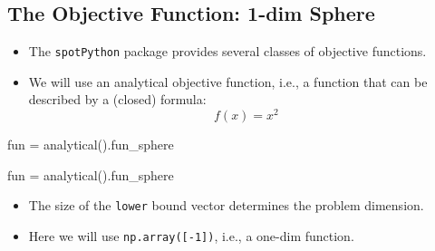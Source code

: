 \documentclass[
  letterpaper,
  DIV=11,
  numbers=noendperiod]{scrreprt}
\newenvironment{Shaded}{\begin{snugshade}}{\end{snugshade}}
\newcommand{\NormalTok}[1]{\textcolor[rgb]{0.00,0.23,0.31}{#1}}
\newcommand{\OperatorTok}[1]{\textcolor[rgb]{0.37,0.37,0.37}{#1}}
\providecommand{\tightlist}{%
  \setlength{\itemsep}{0pt}\setlength{\parskip}{0pt}}\usepackage{longtable,booktabs,array}
\begin{document}
\hypertarget{the-objective-function-1-dim-sphere}{%
\subsection{The Objective Function: 1-dim
Sphere}\label{the-objective-function-1-dim-sphere}}

\begin{itemize}
\tightlist
\item
  The \texttt{spotPython} package provides several classes of objective
  functions.
\item
  We will use an analytical objective function, i.e., a function that
  can be described by a (closed) formula: \[f(x) = x^2 \]
\end{itemize}

\begin{Shaded}
\begin{Highlighting}[]
\NormalTok{fun }\OperatorTok{=}\NormalTok{ analytical().fun\_sphere}
\end{Highlighting}
\end{Shaded}

\begin{Shaded}
\begin{Highlighting}[]
\NormalTok{fun }\OperatorTok{=}\NormalTok{ analytical().fun\_sphere}
\end{Highlighting}
\end{Shaded}

\begin{itemize}
\tightlist
\item
  The size of the \texttt{lower} bound vector determines the problem
  dimension.
\item
  Here we will use \texttt{np.array({[}-1{]})}, i.e., a one-dim
  function.
\end{itemize}
\end{document}
